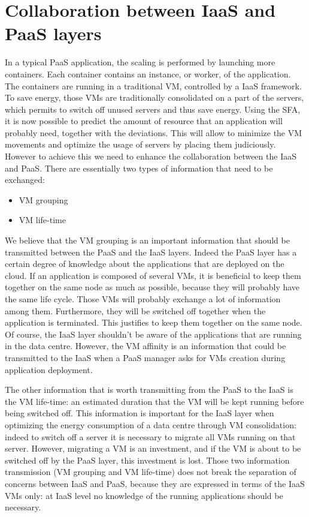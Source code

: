 
\section{Collaboration between IaaS and PaaS layers}
\label{sec:iaaspaas}

In a typical PaaS application, the scaling is performed by launching more containers.
Each container contains an instance, or worker, of the application.
The containers are running in a traditional VM, controlled by a IaaS framework.
To save energy, those VMs are traditionally consolidated on a part of the servers, which permits to switch off unused servers and thus save energy.
Using the SFA, it is now possible to predict the amount of resource that an application will probably need, together with the deviations.
This will allow to minimize the VM movements and optimize the usage of servers by placing them judiciously.
However to achieve this we need to enhance the collaboration between the IaaS and PaaS.
There are essentially two types of information that need to be exchanged:
\begin{itemize}
  \item VM grouping
  \item VM life-time
\end{itemize}

We believe that the VM grouping is an important information that should be transmitted between the PaaS and the IaaS layers.
Indeed the PaaS layer has a certain degree of knowledge about the applications that are deployed on the cloud.
If an application is composed of several VMs, it is beneficial to keep them together on the same node as much as possible, because they will probably have the same life cycle.
Those VMs will probably exchange a lot of information among them.
Furthermore, they will be switched off together when the application is terminated.
This justifies to keep them together on the same node.
Of course, the IaaS layer shouldn't be aware of the applications that are running in the data centre.
However, the VM affinity is an information that could be transmitted to the IaaS when a PaaS manager asks for VMs creation during application deployment.

The other information that is worth transmitting from the PaaS to the IaaS is the VM life-time: an estimated duration that the VM will be kept running before being switched off.
This information is important for the IaaS layer when optimizing the energy consumption of a data centre through VM consolidation: indeed to switch off a server it is necessary to migrate all VMs running on that server.
However, migrating a VM is an investment, and if the VM is about to be switched off by the PaaS layer, this investment is lost.
Those two information transmission (VM grouping and VM life-time) does not break the separation of concerns between IaaS and PaaS, because they are expressed in terms of the IaaS VMs only: at IaaS level no knowledge of the running applications should be necessary.

